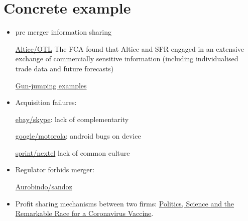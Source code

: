 \documentclass[a4paper]{article}
\begin{document}
\section{Concrete example}

\begin{itemize}
    \item pre merger information sharing
    
    \href{https://sites-herbertsmithfreehills.vuturevx.com/46/12874/compose-email/the-altice-case--a-costly-warning-not-to-engage-in-gun-jumping-before-receiving-merger-control-clearance.asp}{Altice/OTL} The FCA found that Altice and SFR engaged in an extensive exchange of commercially sensitive information (including individualised trade data and future forecasts)
    
    \href{https://www.twobirds.com/en/news/articles/2020/global/double-caution-gun-jumping-risks-in-m-and-a-transactions}{Gun-jumping examples}
    \item Acquisition failures:
    
    \href{https://www.investopedia.com/articles/insights/061816/4-cases-when-ma-strategy-failed-acquirer-ebay-bac.asp}{ebay/skype}: lack of complementarity
    
    \href{https://salessynergy.net/the-biggest-acquisition-disasters-that-put-companies-into-quite-a-bit-of-trouble/}{google/motorola}: android bugs on device
    
    \href{https://www.investopedia.com/articles/financial-theory/08/merger-acquisition-disasters.asp#:~:text=The\%20consolidation\%20of\%20AOL\%20Time,combination\%20up\%20until\%20that\%20time}{sprint/nextel} lack of common culture
    
    \item Regulator forbids merger:
    
    \href{https://www.livemint.com/companies/news/aurobindo-pharma-calls-off-1-billion-deal-with-sandoz-after-failing-to-get-ftc-nod-11585801128011.html}{Aurobindo/sandoz}
    
    \item Profit sharing mechanisms between two firms: \href{https://www.nytimes.com/2020/11/21/us/politics/coronavirus-vaccine.html?referringSource=articleShare}{Politics, Science and the Remarkable Race for a Coronavirus Vaccine}.
\end{itemize}
\end{document}
